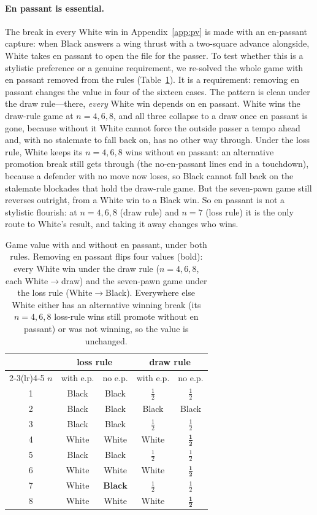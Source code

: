 \documentclass[Afour,sageapa,times]{sagej}
\theoremstyle{plain}
\theoremstyle{definition}
\newcommand{\noepEightDraw}{$\mathbf{\tfrac12}$}
\begin{document}
\paragraph{En passant is essential.} The break in every White win in
Appendix~\ref{app:pv} is made with an en-passant capture: when Black answers a wing
thrust with a two-square advance alongside, White takes en passant to open the file
for the passer. To test whether this is a stylistic preference or a genuine
requirement, we re-solved the whole game with en passant removed from the rules
(Table~\ref{tab:noep}). It is a requirement: removing en passant changes the value
in four of the sixteen cases. The pattern is clean under the draw rule---there,
\emph{every} White win depends on en passant. White wins the draw-rule game at
$n=4,6,8$, and all three collapse to a draw once en passant is gone, because
without it White cannot force the outside passer a tempo ahead and, with no
stalemate to fall back on, has no other way through. Under the loss rule, White
keeps its $n=4,6,8$ wins without en passant: an alternative promotion break still gets
through (the no-en-passant lines end in a touchdown), because a defender with no
move now loses, so Black cannot fall back on the stalemate blockades that hold the
draw-rule game. But the seven-pawn game still reverses outright, from a White win to
a Black win. So en passant is not a stylistic flourish: at $n=4,6,8$ (draw rule) and
$n=7$ (loss rule) it is the only route to White's result, and taking it away changes
who wins.

\begin{table}
\centering
\begin{tabular}{c cc cc}
\toprule
 & \multicolumn{2}{c}{loss rule} & \multicolumn{2}{c}{draw rule} \\
\cmidrule(lr){2-3}\cmidrule(lr){4-5}
$n$ & with e.p. & no e.p. & with e.p. & no e.p. \\
\midrule
1 & Black & Black & $\tfrac12$ & $\tfrac12$ \\
2 & Black & Black & Black & Black \\
3 & Black & Black & $\tfrac12$ & $\tfrac12$ \\
4 & White & White & White & $\mathbf{\tfrac12}$ \\
5 & Black & Black & $\tfrac12$ & $\tfrac12$ \\
6 & White & White & White & $\mathbf{\tfrac12}$ \\
7 & White & $\mathbf{Black}$ & $\tfrac12$ & $\tfrac12$ \\
8 & White & White & White & \noepEightDraw \\
\bottomrule
\end{tabular}
\caption{Game value with and without en passant, under both rules. Removing en
passant flips four values (bold): every White win under the draw rule ($n=4,6,8$,
each White$\rightarrow$draw) and the seven-pawn game under the loss rule
(White$\rightarrow$Black). Everywhere else White either has an alternative winning
break (its $n=4,6,8$ loss-rule wins still promote without en passant) or was not
winning, so the value is unchanged.}
\label{tab:noep}
\end{table}
\end{document}
